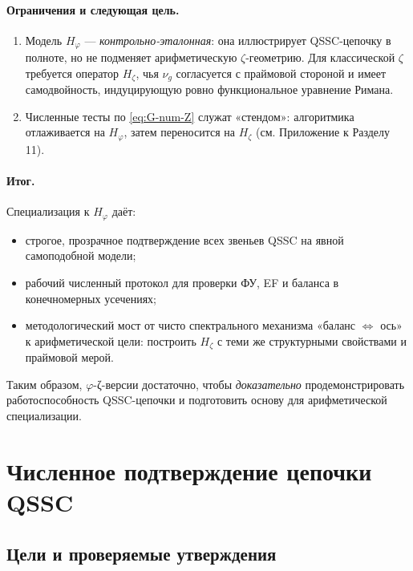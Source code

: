 \documentclass{article}
\numberwithin{equation}{section}
\theoremstyle{plain}
\theoremstyle{definition}
\theoremstyle{remark}
\def\Leftrightarrow{⇔}%
\begin{document}
\paragraph{Ограничения и следующая цель.}
\begin{enumerate}
\item Модель \(H_\varphi\) — \emph{контрольно-эталонная}: она иллюстрирует QSSC-цепочку в полноте, но не подменяет арифметическую \(\zeta\)-геометрию. Для классической \(\zeta\) требуется оператор \(H_{\zeta}\), чья \(\nu_g\) согласуется с праймовой стороной и имеет самодвойность, индуцирующую ровно функциональное уравнение Римана.
\item Численные тесты по \eqref{eq:G-num-Z} служат «стендом»: алгоритмика отлаживается на \(H_\varphi\), затем переносится на \(H_{\zeta}\) (см. Приложение к Разделу 11).
\end{enumerate}

\paragraph{Итог.}
Специализация к \(H_\varphi\) даёт:
\begin{itemize}
\item строгое, прозрачное подтверждение всех звеньев QSSC на явной самоподобной модели;
\item рабочий численный протокол для проверки ФУ, EF и баланса в конечномерных усечениях;
\item методологический мост от чисто спектрального механизма «баланс \(\Leftrightarrow\) ось» к арифметической цели: построить \(H_{\zeta}\) с теми же структурными свойствами и праймовой мерой.
\end{itemize}
Таким образом, \(\varphi\)-ζ-версии достаточно, чтобы \emph{доказательно} продемонстрировать работоспособность QSSC-цепочки и подготовить основу для арифметической специализации.


\clearpage

\section{Численное подтверждение цепочки QSSC}

\subsection*{Цели и проверяемые утверждения}
\end{document}
